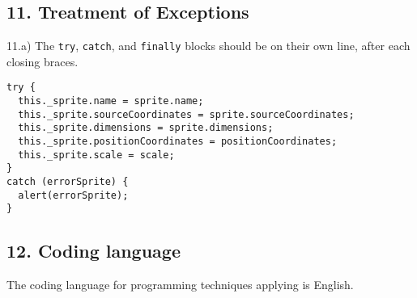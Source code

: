\documentclass[12pt,openright,a4paper,conference,onecolumn,twoside,english,french,spanish]{IEEEtran}
\begin{document}
\begin{Shaded}
\begin{Highlighting}[]
 
   \NormalTok{;}
   
     \NormalTok{:}
      \NormalTok{;}

     \NormalTok{:}
      \NormalTok{;}

     \NormalTok{:}
      \NormalTok{;}

     \NormalTok{:}
      \NormalTok{;}

     \NormalTok{:}
      \NormalTok{;}

     \NormalTok{:}
      \NormalTok{;}

     \NormalTok{:}
      \NormalTok{;}

    \NormalTok{:}
  \NormalTok{\}}
   
   
\NormalTok{\}}
\end{Highlighting}
\end{Shaded}

\subsection{11. Treatment of Exceptions}\label{treatment-of-exceptions}

11.a) The \texttt{try}, \texttt{catch}, and \texttt{finally} blocks
should be on their own line, after each closing braces.

\begin{verbatim}
try {
  this._sprite.name = sprite.name;
  this._sprite.sourceCoordinates = sprite.sourceCoordinates;
  this._sprite.dimensions = sprite.dimensions;
  this._sprite.positionCoordinates = positionCoordinates;
  this._sprite.scale = scale;
}
catch (errorSprite) {
  alert(errorSprite);
}
\end{verbatim}

\subsection{12. Coding language}\label{coding-language}

The coding language for programming techniques applying is English.
\end{document}
